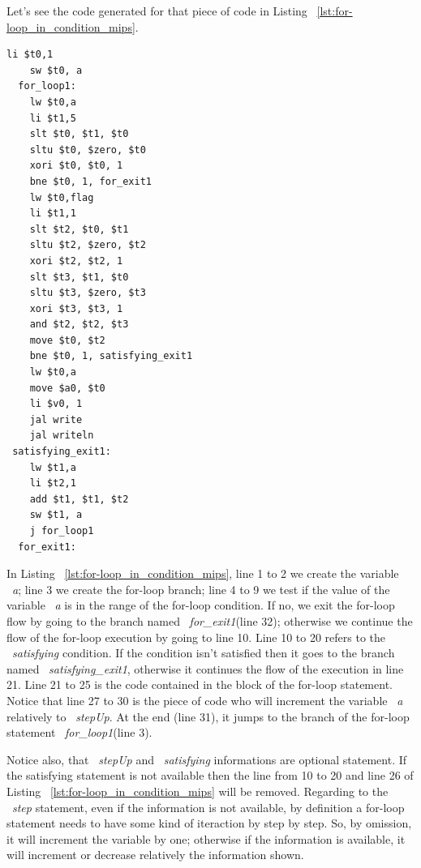 \documentclass[
  oneside,
  11pt, a4paper,
  footinclude=true,
  headinclude=true,
  cleardoublepage=empty
]{scrbook}
\begin{document}
Let's see the code generated for that piece of code in Listing ~\ref{lst:for-loop_in_condition_mips}.

\begin{lstlisting}[caption={Code generated for the LISS code in Listing ~\ref{lst:for-loop_in_condition_LISS}},label={lst:for-loop_in_condition_mips}]
    li $t0,1		
    sw $t0, a		
  for_loop1:
    lw $t0,a		
    li $t1,5		
    slt $t0, $t1, $t0	
    sltu $t0, $zero, $t0	
    xori $t0, $t0, 1	
    bne $t0, 1, for_exit1		
    lw $t0,flag		
    li $t1,1		
    slt $t2, $t0, $t1	
    sltu $t2, $zero, $t2	
    xori $t2, $t2, 1	
    slt $t3, $t1, $t0	
    sltu $t3, $zero, $t3	
    xori $t3, $t3, 1	
    and $t2, $t2, $t3	
    move $t0, $t2		
    bne $t0, 1, satisfying_exit1		
    lw $t0,a		
    move $a0, $t0		
    li $v0, 1
    jal write		
    jal writeln		
 satisfying_exit1:
    lw $t1,a		
    li $t2,1		
    add $t1, $t1, $t2	
    sw $t1, a		
    j for_loop1		
  for_exit1:
\end{lstlisting}

In Listing ~\ref{lst:for-loop_in_condition_mips}, line 1 to 2 we create the variable ~\textit{a}; line 3 we create the for-loop branch; line 4 to 9 we test if the value of the variable ~\textit{a} is in the range of the for-loop condition. If no, we exit the for-loop flow by going to the branch named ~\textit{for\_exit1}(line 32); otherwise we continue the flow of the for-loop execution by going to line 10. Line 10 to 20 refers to the ~\textit{satisfying} condition. If the condition isn't satisfied then it goes to the branch named ~\textit{satisfying\_exit1}, otherwise it continues the flow of the execution in line 21. Line 21 to 25 is the code contained in the block of the for-loop statement. Notice that line 27 to 30 is the piece of code who will increment the variable ~\textit{a} relatively to ~\textit{stepUp}. At the end (line 31), it jumps to the branch of the for-loop statement ~\textit{for\_loop1}(line 3).

Notice also, that ~\textit{stepUp} and ~\textit{satisfying} informations are optional statement. If the satisfying statement is not available then the line from 10 to 20 and line 26 of Listing ~\ref{lst:for-loop_in_condition_mips} will be removed. Regarding to the ~\textit{step} statement, even if the information is not available, by definition a for-loop statement needs to  have some kind of iteraction by step by step. So, by omission, it will increment the variable by one; otherwise if the information is available, it will increment or decrease relatively the information shown.
\end{document}
